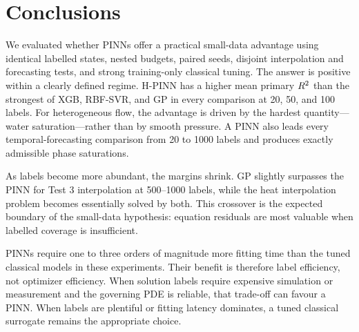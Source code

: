 \section{Conclusions}
\label{sec:conclusion}

We evaluated whether PINNs offer a practical small-data advantage using identical labelled states, nested budgets, paired seeds, disjoint interpolation and forecasting tests, and strong training-only classical tuning. The answer is positive within a clearly defined regime. H-PINN has a higher mean primary \(R^2\) than the strongest of XGB, RBF-SVR, and GP in every comparison at 20, 50, and 100 labels. For heterogeneous flow, the advantage is driven by the hardest quantity---water saturation---rather than by smooth pressure. A PINN also leads every temporal-forecasting comparison from 20 to 1000 labels and produces exactly admissible phase saturations.

As labels become more abundant, the margins shrink. GP slightly surpasses the PINN for Test 3 interpolation at 500--1000 labels, while the heat interpolation problem becomes essentially solved by both. This crossover is the expected boundary of the small-data hypothesis: equation residuals are most valuable when labelled coverage is insufficient.

PINNs require one to three orders of magnitude more fitting time than the tuned classical models in these experiments. Their benefit is therefore label efficiency, not optimizer efficiency. When solution labels require expensive simulation or measurement and the governing PDE is reliable, that trade-off can favour a PINN. When labels are plentiful or fitting latency dominates, a tuned classical surrogate remains the appropriate choice.
